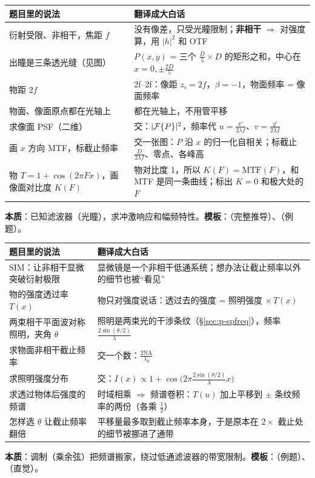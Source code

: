 \begin{center}\small\renewcommand{\arraystretch}{1.3}
\begin{tabular}{@{}P{5.6cm}P{9.8cm}@{}}
\toprule
题目里的说法 & 翻译成大白话\\ \midrule
衍射受限、非相干，焦距 $f$ & 没有像差，只受光瞳限制；\textbf{非相干} $\Rightarrow$ 对强度算，用 $|h|^2$ 和 OTF\\
出瞳是三条透光缝（见图） & $P(x,y)$ = 三个 $\frac D5\times D$ 的矩形之和，中心在 $x=0,\pm\frac{2D}{5}$\\
物距 $2f$ & 2f–2f：像距 $z_i=2f$，$\beta=-1$，物面频率 = 像面频率\\
物面、像面原点都在光轴上 & 都在光轴上，不用管平移\\
求像面 PSF（二维） & 交：$|\mathcal{F}\{P\}|^2$，频率代 $u=\frac{x'}{2\lambda f}$、$v=\frac{y'}{2\lambda f}$\\
画 $x$ 方向 MTF，标截止频率 & 交一张图：$P$ 沿 $x$ 的归一化自相关；标截止 $\frac{D}{2\lambda f}$、零点、各峰高\\
物 $T=1+\cos(2\pi Fx)$，画像面对比度 $K(F)$ & 物对比度 1，所以 $K(F)=\mathrm{MTF}(F)$，和 MTF 是同一条曲线；标出 $K=0$ 和极大处的 $F$\\
\bottomrule
\end{tabular}
\end{center}
\textbf{本质}：已知滤波器（光瞳），求冲激响应和幅频特性。\textbf{模板}：\pageref{ex:3slit}（完整推导）、\pageref{ex:v-3slit}（例题）。

\begin{center}\small\renewcommand{\arraystretch}{1.3}
\begin{tabular}{@{}P{5.6cm}P{9.8cm}@{}}
\toprule
题目里的说法 & 翻译成大白话\\ \midrule
SIM：让非相干显微突破衍射极限 & 显微镜是一个非相干低通系统；想办法让截止频率以外的细节也被“看见”\\
物的强度透过率 $T(x)$ & 物只对强度说话：透过去的强度 = 照明强度 $\times\,T(x)$\\
两束相干平面波对称照明，夹角 $\theta$ & 照明是两束光的干涉条纹（§\ref{sec:p-spfreq}），频率 $\frac{2\sin(\theta/2)}{\lambda}$\\
求物面非相干截止频率 & 交一个数：$\frac{2\mathrm{NA}}{\lambda_0}$\\
求照明强度分布 & 交：$I(x)\propto1+\cos\big(2\pi\frac{2\sin(\theta/2)}{\lambda}x\big)$\\
求透过物体后强度的频谱 & 时域相乘 $\Rightarrow$ 频谱卷积：$\hat T(u)$ 加上平移到 $\pm$ 条纹频率的两份（各乘 $\frac12$）\\
怎样选 $\theta$ 让截止频率翻倍 & 平移量最多取到截止频率本身，于是原本在 $2\times$ 截止处的细节被挪进了通带\\
\bottomrule
\end{tabular}
\end{center}
\textbf{本质}：调制（乘余弦）把频谱搬家，绕过低通滤波器的带宽限制。\textbf{模板}：\pageref{ex:v-sim}（例题）、\pageref{sec:sim}（直觉）。

